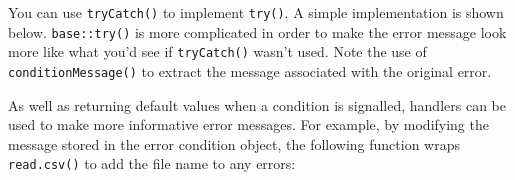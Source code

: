 You can use \texttt{tryCatch()} to implement \texttt{try()}. A simple
implementation is shown below. \texttt{base::try()} is more complicated
in order to make the error message look more like what you'd see if
\texttt{tryCatch()} wasn't used. Note the use of
\texttt{conditionMessage()} to extract the message associated with the
original error.

\begin{Shaded}
\begin{Highlighting}[]
\StringTok{ } \NormalTok{) \{}
   
    \StringTok{ }
    \NormalTok{(} \NormalTok{))}
  \NormalTok{\})}
\NormalTok{\}}

\NormalTok{(}\NormalTok{)}
\NormalTok{(}\NormalTok{(}\NormalTok{))}
\NormalTok{(}\NormalTok{(}\NormalTok{), } \NormalTok{)}
\end{Highlighting}
\end{Shaded}

As well as returning default values when a condition is signalled,
handlers can be used to make more informative error messages. For
example, by modifying the message stored in the error condition object,
the following function wraps \texttt{read.csv()} to add the file name to
any errors:

\begin{Shaded}
\begin{Highlighting}[]
\StringTok{ }
  \NormalTok{(} 
    \StringTok{ }\NormalTok{)}
  \NormalTok{\})}
\NormalTok{\}}
\NormalTok{(}\NormalTok{)}
\NormalTok{(}\NormalTok{)}
\end{Highlighting}
\end{Shaded}

